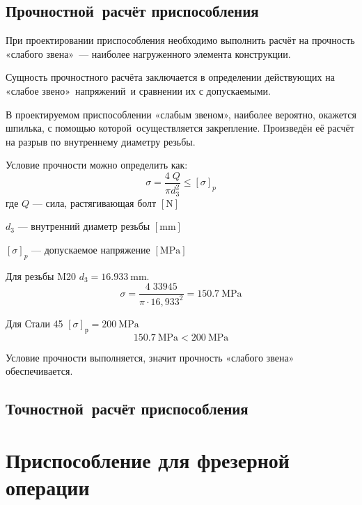 \documentclass[14pt,russian,a4paper]{extreport}
\begin{document}
\subsection{Прочностной расчёт приспособления}

При проектировании приспособления необходимо выполнить расчёт на прочность «слабого звена» --- наиболее нагруженного элемента конструкции.

Сущность прочностного расчёта заключается в определении действующих на «слабое звено» напряжений и сравнении их с допускаемыми.

В проектируемом приспособлении «слабым звеном», наиболее вероятно, окажется шпилька, с помощью которой осуществляется закрепление. Произведён её расчёт на разрыв по внутреннему диаметру резьбы.

Условие прочности можно определить как: \cite[форм.~14.6]{ryahovskiy:dm}
\begin{equation}
  \sigma = \frac{4 \; Q}{\pi d_3^2} \leq \left[ \sigma \right]_p
\end{equation}
где $Q$ --- сила, растягивающая болт $\left[\si{\newton}\right]$ \par
$d_3$ --- внутренний диаметр резьбы $\left[\si{\milli\meter}\right]$ \par
$\left[ \sigma \right]_p$ --- допускаемое напряжение $\left[\si{\mega\pascal}\right]$

Для резьбы M20 $ d_3 = \SI{16,933}{\milli\meter} $.
\begin{equation*}
  \sigma = \frac{4 \; 33945}{\pi \cdot 16,933^2} = \SI{150,7}{\mega\pascal}
\end{equation*}

Для Стали 45 $ \left[\sigma\right]_\text{р} = \SI{200}{\mega\pascal} $
\begin{equation*}
  \SI{150,7}{\mega\pascal} < \SI{200}{\mega\pascal}
\end{equation*}

Условие прочности выполняется, значит прочность «слабого звена» обеспечивается.

\subsection{Точностной расчёт приспособления}

\section{Приспособление для фрезерной операции}
\end{document}
